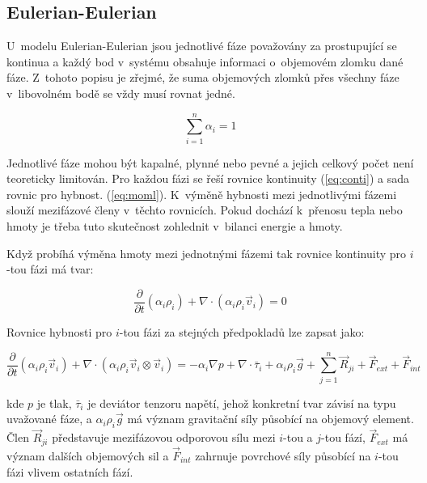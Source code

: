 \subsection{Eulerian-Eulerian}
U~modelu Eulerian-Eulerian jsou jednotlivé fáze považovány za prostupující se kontinua a každý bod v~systému obsahuje informaci o~objemovém zlomku dané fáze. Z~tohoto popisu je zřejmé, že suma objemových zlomků přes všechny fáze v~libovolném bodě se vždy musí rovnat jedné. 

\begin{equation}
	\sum_{i=1}^n \alpha_{i} = 1
	\label{eq:volfrac}
\end{equation} 

\noindent Jednotlivé fáze mohou být kapalné, plynné nebo pevné a jejich celkový počet není teoreticky limitován. Pro každou fázi se řeší rovnice kontinuity (\ref{eq:conti}) a sada rovnic pro hybnost. (\ref{eq:moml}). K~výměně hybnosti mezi jednotlivými fázemi slouží mezifázové členy v~těchto rovnicích. Pokud dochází k~přenosu tepla nebo hmoty je třeba tuto skutečnost zohlednit v~bilanci energie a hmoty.    

Když probíhá výměna hmoty mezi jednotnými fázemi tak rovnice kontinuity pro $i$-tou fázi má tvar:

\begin{equation}
	\frac{\partial}{\partial t} (\alpha_{i}\rho_{i}) +  \nabla \cdot (\alpha_{i}\rho_{i}\vec{v}_{i}) = 0
	\label{eq:conti}
\end{equation}

\noindent Rovnice hybnosti pro $i$-tou fázi za stejných předpokladů lze zapsat jako:

\begin{equation}
	\frac{\partial}{\partial t} (\alpha_{i}\rho_{i}\vec{v}_{i}) + \nabla \cdot (\alpha_{i}\rho_{i} \vec{v}_{i} \otimes \vec{v}_{i}) = -\alpha_{i} \nabla p + \nabla \cdot \bar{\tau}_{i} + \alpha_{i}\rho_{i}\vec{g} + \sum_{j=1}^n \vec{R}_{ji} + \vec{F}_{ext} + \vec{F}_{int}
	\label{eq:moml}
\end{equation}

\noindent kde $p$ je tlak, $\bar{\tau}_{i}$ je deviátor tenzoru napětí, jehož konkretní tvar závisí na typu uvažované fáze, a $\alpha_{i}\rho_{i}\vec{g}$ má význam gravitační síly působící na objemový element. Člen $\vec{R}_{ji}$ představuje mezifázovou odporovou sílu mezi $i$-tou a $j$-tou fází, $\vec{F}_{ext}$ má význam dalších objemových sil a $\vec{F}_{int}$ zahrnuje povrchové síly působící na $i$-tou fázi vlivem ostatních fází. 

